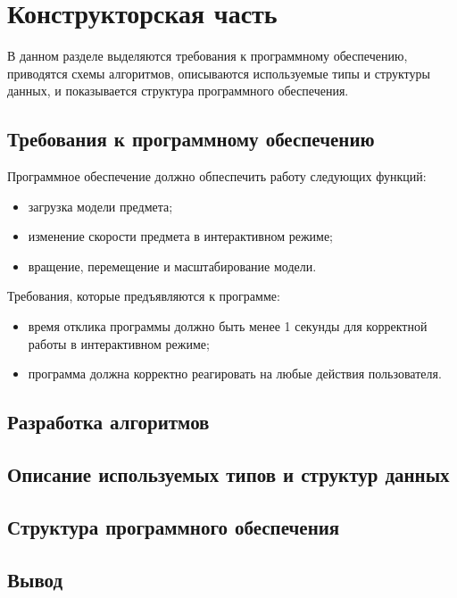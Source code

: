 \chapter{Конструкторская часть}

В данном разделе выделяются требования к программному обеспечению, приводятся схемы алгоритмов, описываются используемые типы и структуры данных, и показывается структура программного обеспечения.

\section{Требования к программному обеспечению}

Программное обеспечение должно обпеспечить работу следующих функций:

\begin{itemize}
	\item загрузка модели предмета;
	\item изменение скорости предмета в интерактивном режиме;
	\item вращение, перемещение и масштабирование модели.
\end{itemize}

Требования, которые предъявляются к программе:

\begin{itemize}
	\item время отклика программы должно быть менее 1 секунды для корректной работы в интерактивном режиме;
	\item программа должна корректно реагировать на любые действия пользователя.
\end{itemize}

\section{Разработка алгоритмов}

\section{Описание используемых типов и структур данных}

\section{Структура программного обеспечения}

\section*{Вывод}